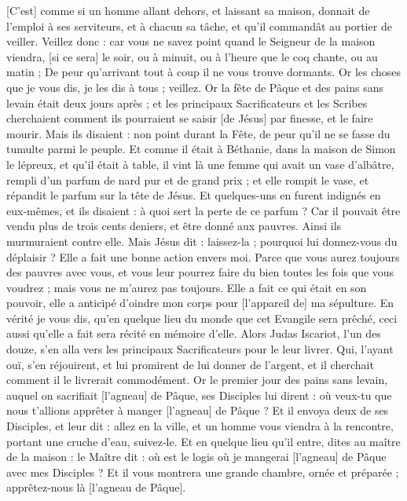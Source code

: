 \begin{multicols}{2}
[C'est] comme si un homme allant dehors, et laissant sa maison, donnait de l'emploi à ses serviteurs, et à chacun sa tâche, et qu'il commandât au portier de veiller.
Veillez donc : car vous ne savez point quand le Seigneur de la maison viendra, [si ce sera] le soir, ou à minuit, ou à l'heure que le coq chante, ou au matin ;
De peur qu'arrivant tout à coup il ne vous trouve dormants.
Or les choses que je vous dis, je les dis à tous ; veillez.
\VerseOne{}Or la fête de Pâque et des pains sans levain était deux jours après ; et les principaux Sacrificateurs et les Scribes cherchaient comment ils pourraient se saisir [de Jésus] par finesse, et le faire mourir.
Mais ils disaient : non point durant la Fête, de peur qu'il ne se fasse du tumulte parmi le peuple.
Et comme il était à Béthanie, dans la maison de Simon le lépreux, et qu'il était à table, il vint là une femme qui avait un vase d'albâtre, rempli d'un parfum de nard pur et de grand prix ; et elle rompit le vase, et répandit le parfum sur la tête de Jésus.
Et quelques-uns en furent indignés en eux-mêmes, et ils disaient : à quoi sert la perte de ce parfum ?
Car il pouvait être vendu plus de trois cents deniers, et être donné aux pauvres. Ainsi ils murmuraient contre elle.
Mais Jésus dit : laissez-la ; pourquoi lui donnez-vous du déplaisir ? Elle a fait une bonne action envers moi.
Parce que vous aurez toujours des pauvres avec vous, et vous leur pourrez faire du bien toutes les fois que vous voudrez ; mais vous ne m'aurez pas toujours.
Elle a fait ce qui était en son pouvoir, elle a anticipé d'oindre mon corps pour [l'appareil de] ma sépulture.
En vérité je vous dis, qu'en quelque lieu du monde que cet Evangile sera prêché, ceci aussi qu'elle a fait sera récité en mémoire d'elle.
Alors Judas Iscariot, l'un des douze, s'en alla vers les principaux Sacrificateurs pour le leur livrer.
Qui, l'ayant ouï, s'en réjouirent, et lui promirent de lui donner de l'argent, et il cherchait comment il le livrerait commodément.
Or le premier jour des pains sans levain, auquel on sacrifiait [l'agneau] de Pâque, ses Disciples lui dirent : où veux-tu que nous t'allions apprêter à manger [l'agneau] de Pâque ?
Et il envoya deux de ses Disciples, et leur dit : allez en la ville, et un homme vous viendra à la rencontre, portant une cruche d'eau, suivez-le.
Et en quelque lieu qu'il entre, dites au maître de la maison : le Maître dit : où est le logis où je mangerai [l'agneau] de Pâque avec mes Disciples ?
Et il vous montrera une grande chambre, ornée et préparée ; apprêtez-nous là [l'agneau de Pâque].

\end{multicols}
